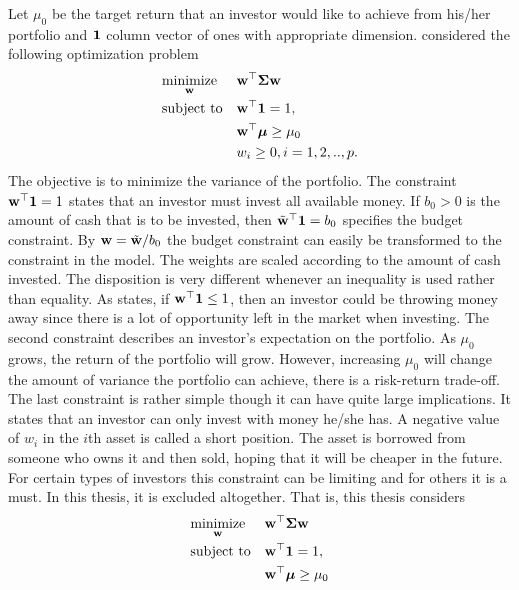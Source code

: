 \documentclass[12pt, oneside]{book}\usepackage{knitr}
\begin{document}
Let $\mu_0$ be the target return that an investor would like to achieve from his/her portfolio and $\mathbf{1}$ column vector of ones with appropriate dimension. 
\citet{markowitz1959portfolio} considered the following optimization problem
\begin{equation}\label{eqn:markowitz_optim}
\begin{aligned}
& \underset{\mathbf{w}}{\text{minimize}} 
& & \mathbf{w}^\top \mathbf{\Sigma} \mathbf{w} \\
& \text{subject to}
& & \mathbf{w}^\top \mathbf{1} = 1, \\
& && \mathbf{w}^\top \mbox{\boldmath$\mu$} \geq \mu_0 \\
&&& w_i \geq 0, i=1,2,..,p.
\end{aligned}
\end{equation}
The objective is to minimize the variance of the portfolio. 
The constraint $\mathbf{w}^\top \mathbf{1} = 1$ states that an investor must invest all available money.
If $b_0>0$ is the amount of cash that is to be invested, then $\tilde{\mathbf{w}}^\top\mathbf{1} = b_0$ specifies the budget constraint.
By $\mathbf{w}=\tilde{\mathbf{w}}/b_0$ the budget constraint can easily be transformed to the constraint in the model.
The weights are scaled according to the amount of cash invested.
The disposition is very different whenever an inequality is used rather than equality.
As \citet{hult2012risk} states, if $\mathbf{w}^\top \mathbf{1} \leq 1$, then an investor could be throwing money away since there is a lot of opportunity left in the market when investing.
The second constraint describes an investor's expectation on the portfolio.
As $\mu_0$ grows, the return of the portfolio will grow. 
However, increasing $\mu_0$ will change the amount of variance the portfolio can achieve, there is a risk-return trade-off. 
The last constraint is rather simple though it can have quite large implications. 
It states that an investor can only invest with money he/she has. 
A negative value of $w_i$ in the $i$th asset is called a short position.
The asset is borrowed from someone who owns it and then sold, hoping that it will be cheaper in the future.
For certain types of investors this constraint can be limiting and for others it is a must.
In this thesis, it is excluded altogether. 
That is, this thesis considers
\begin{equation}\label{eqn:mean_variance}
\begin{aligned}
& \underset{\mathbf{w}}{\text{minimize}} 
& & \mathbf{w}^\top \mathbf{\Sigma} \mathbf{w} \\
& \text{subject to}
& & \mathbf{w}^\top \mathbf{1} = 1, \\
& && \mathbf{w}^\top \mbox{\boldmath$\mu$} \geq \mu_0 \\
\end{aligned}
\end{equation}
\end{document}
